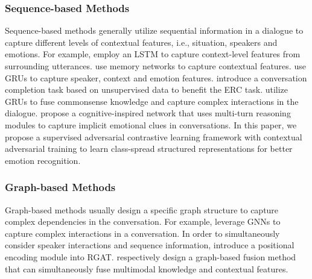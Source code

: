 \documentclass[11pt]{article}
\begin{document}
\subsubsection{Sequence-based Methods}
Sequence-based methods 
\cite{DBLP:conf/acl/PoriaCHMZM17,DBLP:conf/naacl/HazarikaPZCMZ18,DBLP:conf/emnlp/HazarikaPMCZ18,DBLP:conf/aaai/MajumderPHMGC19,DBLP:conf/emnlp/GhosalMGMP20,DBLP:conf/emnlp/JiaoLK20,DBLP:conf/aaai/JiaoLK20,DBLP:conf/acl/HuWH20,DBLP:conf/ijcai/ZhaoZL22} generally utilize sequential information in a dialogue to capture different levels of contextual features, i.e., situation, speakers and emotions. 
For example, \citet{DBLP:conf/acl/PoriaCHMZM17} employ an LSTM to capture context-level features from surrounding utterances.
\citet{DBLP:conf/naacl/HazarikaPZCMZ18,DBLP:conf/emnlp/HazarikaPMCZ18,DBLP:conf/aaai/JiaoLK20} use memory networks to capture contextual features.
\citet{DBLP:conf/aaai/MajumderPHMGC19} use GRUs to capture speaker, context and emotion features.
\citet{DBLP:conf/emnlp/JiaoLK20} introduce a conversation completion task based on unsupervised data to benefit the ERC task.
\citet{DBLP:conf/emnlp/GhosalMGMP20,DBLP:conf/ijcai/ZhaoZL22} utilize GRUs to fuse commonsense knowledge and capture complex interactions in the dialogue.
\citet{DBLP:conf/acl/HuWH20} 
propose a cognitive-inspired network that uses multi-turn reasoning modules to capture implicit emotional clues in conversations.
In this paper, we propose a supervised adversarial contrastive learning framework with contextual adversarial training to learn class-spread structured representations for better emotion recognition.

\subsubsection{Graph-based Methods}
Graph-based methods 
\cite{DBLP:conf/emnlp/GhosalMPCG19,DBLP:conf/ijcai/ZhangWSLZZ19,DBLP:conf/emnlp/IshiwatariYMG20,DBLP:conf/acl/ShenWYQ20,DBLP:conf/acl/HuLZJ20,DBLP:conf/icassp/HuHWJM22,DBLP:conf/ijcai/BaoMWZH22}
usually design a specific graph structure to capture complex dependencies in the conversation.
For example, \citet{DBLP:conf/emnlp/GhosalMPCG19,DBLP:conf/ijcai/ZhangWSLZZ19,DBLP:conf/acl/ShenWYQ20}  leverage GNNs to capture complex interactions in a conversation.
In order to simultaneously consider speaker interactions and sequence information, \citet{DBLP:conf/emnlp/IshiwatariYMG20} introduce a positional encoding module into RGAT.
\citet{DBLP:conf/acl/HuLZJ20,DBLP:conf/icassp/HuHWJM22} respectively design a graph-based fusion method that can simultaneously fuse multimodal knowledge and contextual features.
\end{document}
